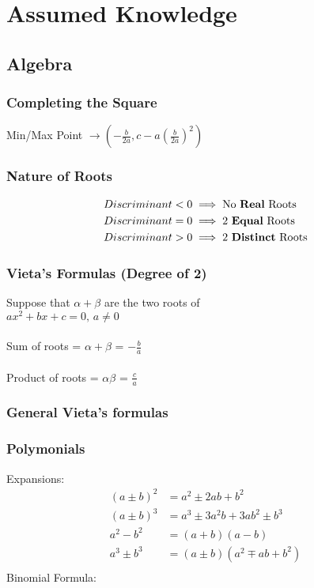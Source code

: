 \documentclass[../main.tex]{subfiles}
\begin{document}
\section{Assumed Knowledge}

\subsection{Algebra}
\subsubsection{Completing the Square}
Min/Max Point \(\displaystyle \to \left(-\frac{b}{2a}, c-a\left(\frac{b}{2a}\right)^{2}\right)\)

\subsubsection{Nature of Roots}
\begin{align*}
    Discriminant < 0 &\implies \text{No \textbf{Real} Roots}\\
    Discriminant = 0 &\implies \text{2 \textbf{Equal} Roots}\\
    Discriminant > 0 &\implies \text{2 \textbf{Distinct} Roots}
\end{align*}

\subsubsection{Vieta's Formulas (Degree of 2)}
Suppose that \(\alpha + \beta\) are the two roots of \\
\(\displaystyle ax^{2}+bx+c=0, \, a\neq0\) \\\\
Sum of roots = \(\alpha + \beta\) = \(\displaystyle -\frac{b}{a}\) \\\\
Product of roots = \(\alpha\beta\) = \(\displaystyle \frac{c}{a}\)

\subsubsection{General Vieta's formulas}


\subsubsection{Polymonials}
Expansions:
\begin{align*}
    (a \pm b)^{2} &= a^{2}\pm 2ab+b^{2} \\
    (a \pm b)^{3} &= a^{3}\pm 3a^{2}b+3ab^{2}\pm b^{3} \\
    a^{2}-b^{2} &= (a+b)(a-b) \\
    a^{3}\pm b^{3} &= (a\pm b)\left(a^{2} \mp ab+b^{2}\right) \\
\end{align*}
Binomial Formula:
\end{document}

